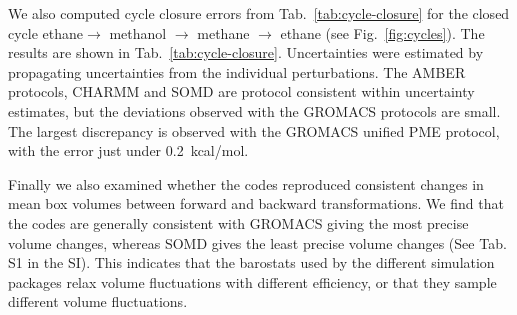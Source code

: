 \documentclass[journal=jctcce,manuscript=article]{achemso}
\begin{document}
We also computed cycle closure errors from Tab.~\ref{tab:cycle-closure} for
the closed cycle ethane$ \rightarrow$ methanol $\rightarrow$ methane $\rightarrow$ ethane (see Fig.~\ref{fig:cycles}). The results are shown in Tab.~\ref{tab:cycle-closure}. Uncertainties were estimated by propagating uncertainties from the individual perturbations. The AMBER protocols, CHARMM and SOMD are protocol consistent within uncertainty estimates, but the deviations observed with the GROMACS protocols are small. The largest discrepancy is observed with the GROMACS unified PME protocol, with the error just under \SI{0.2}{kcal/mol}.

\begin{table}[]
  \begin{minipage}{\linewidth}
    \caption{Cycle closure errors in \si{kcal.mol^{-1}}) for  ethane$ \rightarrow$ methanol. $\rightarrow$ methane
$\rightarrow$ ethane. Uncertainties denote a 95\% confidence  interval}\label{tab:cycle-closure}
  \end{minipage}
\end{table}

Finally we also examined whether the codes reproduced consistent changes in mean box volumes between forward and backward transformations. We find that the codes are generally consistent with GROMACS giving the most precise volume changes, whereas SOMD gives the least precise volume changes (See Tab. S1 in the SI). This indicates that the barostats used by the different simulation packages relax volume fluctuations with different efficiency, or that they sample different volume fluctuations.
\end{document}
